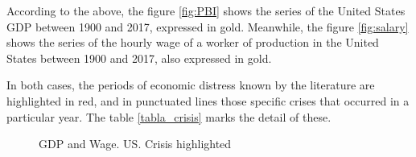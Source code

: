 \documentclass[a4paper]{article}
\begin{document}
	According to the above, the figure \ref{fig:PBI} shows the series of the United States GDP between 1900 and 2017, expressed in gold. Meanwhile, the figure \ref{fig:salary} shows the series of the hourly wage of a worker of production in the United States between 1900 and 2017, also expressed in gold.
	
	In both cases, the periods of economic distress known by the literature are highlighted in red, and in punctuated lines those specific crises that occurred in a particular year. The table \ref{tabla_crisis} marks the detail of these.
	
	
	\begin{figure}[H]
		\centering
		\caption{GDP and Wage. US. Crisis highlighted} \label{fig:series_crisis}
	\end{figure}
	
\end{document}

